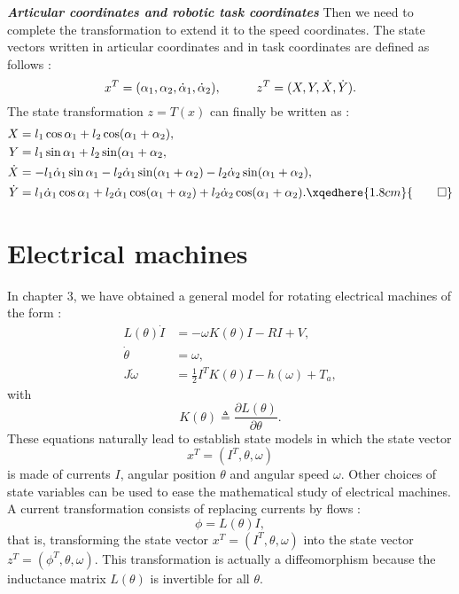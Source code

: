 \begin{exemple}{\bf \em Articular coordinates and robotic task coordinates}
Then we need to complete the transformation to extend it to the speed coordinates. The state vectors written in articular coordinates and in task coordinates are defined as follows : 
$$
x^T = (\alpha_1, \alpha_2, \dot \alpha_1, \dot\alpha_2), \hspace*{10mm} z^T
= (X,Y,\dot X, \dot Y).
$$
The state transformation $z = T(x)$ can finally be written as :
\begin{equation*} \begin{split}
X &= l_1 \cos\alpha_1 + l_2 \cos(\alpha_1 + \alpha_2),\\
Y&= l_1 \sin\alpha_1 + l_2 \sin(\alpha_1 + \alpha_2,\\
\dot X &=-l_1 \dot \alpha_1\sin\alpha_1 -l_2 \dot \alpha_1\sin(\alpha_1+\alpha_2) - l_2 \dot \alpha_2\sin(\alpha_1 + \alpha_2),\\
\dot Y &= l_1 \dot \alpha_1\cos\alpha_1 + l_2 \dot \alpha_1\cos(\alpha_1+\alpha_2) + l_2 \dot \alpha_2\cos(\alpha_1 + \alpha_2). \xqedhere{1.8cm}{\qed}
\end{split} \end{equation*}
\end{exemple}

\section{Electrical machines}

In chapter 3, we have obtained a general model for rotating electrical machines of the form :
\begin{equation*} \begin{split}
L(\theta) \dot I &= -\omega K(\theta) I - RI +V, \\
\dot\theta &= \omega, \label{machel}\\
J \dot \omega &= \frac{1}{2}I^TK(\theta)I - h(\omega) + T_a, 
\end{split} \end{equation*}
with
$$
K(\theta)\triangleq\frac{\partial L(\theta)}{\partial \theta}.
$$
These equations naturally lead to establish state models in which the state vector
$$
x^T = (I^T, \theta, \omega)
$$
is made of currents $I$, angular position $\theta$ and angular speed $\omega$.  Other choices of state variables can be used to ease the mathematical study of electrical machines. A current transformation consists of replacing currents by flows :
$$
\phi = L(\theta)I,
$$
that is, transforming the state vector $x^T = (I^T, \theta, \omega)$ into the state vector $z^T = (\phi^T, \theta, \omega)$. This transformation is actually a diffeomorphism because the inductance matrix 
$L(\theta)$ is invertible for all $\theta$.

